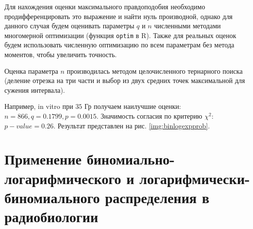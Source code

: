 \documentclass[12pt, specialist, subf, substylefile = spbu_report.rtx]{disser}
\begin{document}
	Для нахождения оценки максимального правдоподобия необходимо продифференцировать это выражение и найти нуль производной, однако для данного случая будем оценивать параметры $ q $ и $ n $ численными методами многомерной оптимизации (функция \verb|optim| в R). Также для реальных оценок будем использовать численную оптимизацию по всем параметрам без метода моментов, чтобы увеличить точность.
	
	Оценка параметра $n$ производилась методом целочисленного тернарного поиска (деление отрезка на три части и выбор из двух средних точек максимальной для сужения интервала).
	
	Например, in vitro при $ 35 $ Гр получаем наилучшие оценки: $ n = 866, q = 0.1799, p = 0.0015$. Значимость согласия по критерию $ \chi ^2 $: $ p-value = 0.26 $. Результат представлен на рис. \ref{img:binlogexpprob}.
	
	\section{Применение биномиально-логарифмического и логарифмически-биномиального распределения в радиобиологии}
	
	\label{radiobiology}
	
\end{document}
